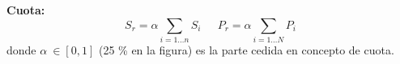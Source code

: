 \begin{f}
\textbf{Cuota:}
\[
S_r=\alpha \sum_{i=1\ldots n}S_i\quad \ \ P_r=\alpha\sum_{i=1\ldots N}P_i 
\]
donde \(\alpha\ \in [0,1]\) (25 \% en la figura) es la parte cedida en concepto de cuota.
	

	

\end{f}

